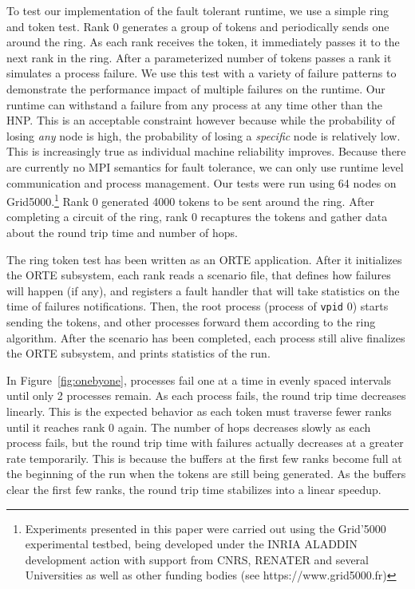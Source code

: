 \documentclass{llncs}
\begin{document}
To test our implementation of the fault tolerant runtime, we use a
simple ring and token test. Rank 0 generates a group of tokens and
periodically sends one around the ring. As each rank receives the
token, it immediately passes it to the next rank in the ring. After a
parameterized number of tokens passes a rank it simulates a process
failure. We use this test with a variety of failure patterns to
demonstrate the performance impact of multiple failures on the
runtime. Our runtime can withstand a failure from any process at any
time other than the HNP. This is an acceptable constraint
however because while the probability of losing \emph{any}
node is high, the probability of losing a \emph{specific}
node is relatively low. This is increasingly true as individual
machine reliability improves. Because there are currently no MPI
semantics for fault tolerance, we can only use runtime level
communication and process management. Our tests were run using 64
nodes on Grid5000.\footnote{Experiments presented in this paper were
  carried out using the Grid'5000 experimental testbed, being
  developed under the INRIA ALADDIN development action with support
  from CNRS, RENATER and several Universities as well as other funding
  bodies (see https://www.grid5000.fr)} Rank 0 generated 4000 tokens
to be sent around the ring. After completing a circuit of the ring,
rank 0 recaptures the tokens and gather data about the round trip time
and number of hops.

The ring token test has been written as an ORTE application. After it
initializes the ORTE subsystem, each rank reads a scenario file, that
defines how failures will happen (if any), and registers a fault
handler that will take statistics on the time of failures
notifications. Then, the root process (process of \texttt{vpid} 0)
starts sending the tokens, and other processes forward them according
to the ring algorithm. After the scenario has been completed, each
process still alive finalizes the ORTE subsystem, and prints
statistics of the run.


In Figure~\ref{fig:onebyone}, processes fail one at a time in evenly
spaced intervals until only 2 processes remain. As each process fails,
the round trip time decreases linearly. This is the expected behavior
as each token must traverse fewer ranks until it reaches rank 0
again. The number of hops decreases slowly as each process fails, but
the round trip time with failures actually decreases at a greater rate
temporarily. This is because the buffers at the first few ranks become
full at the beginning of the run when the tokens are still being
generated. As the buffers clear the first few ranks, the round trip
time stabilizes into a linear speedup.
\end{document}
